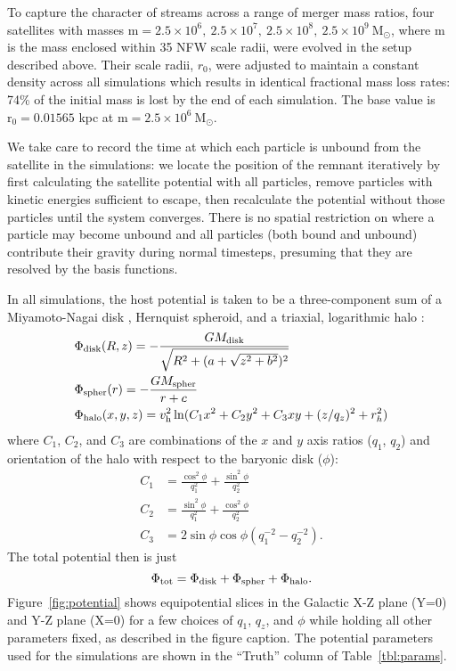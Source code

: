 \documentclass[letterpaper,12pt,preprint]{aastex}
\newcommand{\msun}{\mathrm{M}_\odot}
\newcommand{\vhalo}{v_{\rm h}}
\begin{document}
To capture the character of streams across a range of merger mass ratios, four satellites with masses $\mathrm{m} = 2.5 \times 10^6,\ 2.5 \times 10^7,\ 2.5 \times 10^8,\ 2.5 \times 10^9\ \msun$, where m is the mass enclosed within 35 NFW scale radii, were evolved in the setup described above. Their scale radii, $r_0$, were adjusted to maintain a constant density across all simulations which results in identical fractional mass loss rates: 74\% of the initial mass is lost by the end of each simulation. The base value is $\mathrm{r_0}=0.01565$ kpc at $\mathrm{m} = 2.5 \times 10^6\ \msun$.

We take care to record the time at which each particle is unbound from the satellite in the simulations: we locate the position of the remnant iteratively by first calculating the satellite potential with all particles, remove particles with kinetic energies sufficient to escape, then recalculate the potential without those particles until the system converges. There is no spatial restriction on where a particle may become unbound and all particles (both bound and unbound) contribute their gravity during normal timesteps, presuming that they are resolved by the basis functions. 

In all simulations, the host potential is taken to be a three-component sum of a Miyamoto-Nagai disk \citep{miyamoto75}, Hernquist spheroid, and a triaxial, logarithmic halo \citep[e.g.,][]{law10}:
\begin{align}
	&\Phi_{\rm disk}(R,z) = -\frac{GM_{\rm disk}}{\sqrt{R^2 + (a + \sqrt{z^2 + b^2})^2}}\\
	&\Phi_{\rm spher}(r) = -\frac{GM_{\rm spher}}{r + c}\\
	&\Phi_{\rm halo}(x,y,z) = \vhalo^2 \ln(C_1 x^2 + C_2 y^2 + C_3 xy + (z/q_z)^2 + r_h^2)
\end{align}
where $C_1$, $C_2$, and $C_3$ are combinations of the $x$ and $y$ axis
ratios ($q_1$, $q_2$) and orientation of the halo with respect to the
baryonic disk ($\phi$):
\begin{align}
  C_1 &= \frac{\cos^2\phi}{q_1^2} + \frac{\sin^2\phi}{q_2^2}\\
  C_2 &= \frac{\sin^2\phi}{q_1^2} + \frac{\cos^2\phi}{q_2^2}\\
  C_3 &= 2\sin\phi\cos\phi \left(q_1^{-2} - q_2^{-2}\right).
\end{align}
The total potential then is just
\begin{equation}
	\Phi_{\rm tot} = \Phi_{\rm disk} + \Phi_{\rm spher} + \Phi_{\rm halo}\label{eq:lm10}.
\end{equation}
Figure~\ref{fig:potential} shows equipotential slices in the Galactic X-Z plane (Y=0) and Y-Z plane (X=0) for a few choices of  $q_1$,  $q_z$, and $\phi$ while holding all other parameters fixed, as described in the figure caption. The potential parameters used for the simulations are shown in the ``Truth'' column of Table~\ref{tbl:params}.
\end{document}
